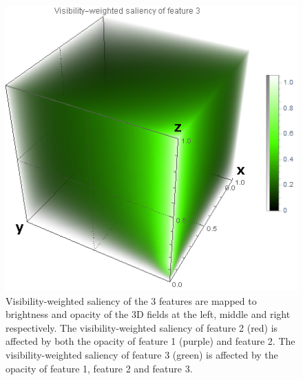 \begin{figure}
\begin{minipage}{.3\textwidth}
	\end{minipage}
	\begin{minipage}{.3\textwidth}
		\includegraphics[width=1\linewidth]{images/densityplot3}	
	\end{minipage}
	\caption{Visibility-weighted saliency of the 3 features are mapped to brightness and opacity of the 3D fields at the left, middle and right respectively. The visibility-weighted saliency of feature 2 (red) is affected by both the opacity of feature 1 (purple) and feature 2. The visibility-weighted saliency of feature 3 (green) is affected by the opacity of feature 1, feature 2 and feature 3.}
	\label{fig:nucleon_densityplot}
\end{figure}

